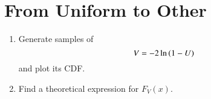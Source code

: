 \documentclass[journal,12pt,twocolumn]{IEEEtran}
\renewcommand\thesection{\arabic{section}}
\begin{document}
\section{From Uniform to Other}
\begin{enumerate}[label=\thesection.\arabic*
        ,ref=\thesection.\theenumi]
    \item
          Generate samples of
          \begin{equation}
              V = -2\ln\left(1-U\right)
          \end{equation}
          and plot its CDF.
    \item Find a theoretical expression for $F_V(x)$.

\end{enumerate}
\end{document}

